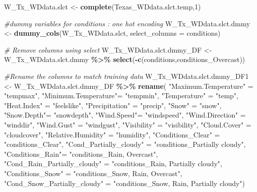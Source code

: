 \documentclass[
]{article}
\newenvironment{Shaded}{\begin{snugshade}}{\end{snugshade}}
\newcommand{\AttributeTok}[1]{\textcolor[rgb]{0.13,0.29,0.53}{#1}}
\newcommand{\CommentTok}[1]{\textcolor[rgb]{0.56,0.35,0.01}{\textit{#1}}}
\newcommand{\DecValTok}[1]{\textcolor[rgb]{0.00,0.00,0.81}{#1}}
\newcommand{\FunctionTok}[1]{\textcolor[rgb]{0.13,0.29,0.53}{\textbf{#1}}}
\newcommand{\NormalTok}[1]{#1}
\newcommand{\OtherTok}[1]{\textcolor[rgb]{0.56,0.35,0.01}{#1}}
\newcommand{\SpecialCharTok}[1]{\textcolor[rgb]{0.81,0.36,0.00}{\textbf{#1}}}
\newcommand{\StringTok}[1]{\textcolor[rgb]{0.31,0.60,0.02}{#1}}
\begin{document}
\begin{Shaded}
\begin{Highlighting}[]
\NormalTok{W\_Tx\_WDdata.slct }\OtherTok{\textless{}{-}} \FunctionTok{complete}\NormalTok{(Texas\_WDdata.slct.temp,}\DecValTok{1}\NormalTok{)}

\CommentTok{\#dummy variables for conditions : one hot encoding}
\NormalTok{W\_Tx\_WDdata.slct.dmmy }\OtherTok{\textless{}{-}} \FunctionTok{dummy\_cols}\NormalTok{(W\_Tx\_WDdata.slct, }
                                         \AttributeTok{select\_columns =} \StringTok{\textquotesingle{}conditions\textquotesingle{}}\NormalTok{)}

\CommentTok{\# Remove columns using select}
\NormalTok{W\_Tx\_WDdata.slct.dmmy\_DF }\OtherTok{\textless{}{-}}\NormalTok{ W\_Tx\_WDdata.slct.dmmy }\SpecialCharTok{\%\textgreater{}\%} 
  \FunctionTok{select}\NormalTok{(}\SpecialCharTok{{-}}\FunctionTok{c}\NormalTok{(conditions,conditions\_Overcast))}

\CommentTok{\#Rename the columns to match training data }
\NormalTok{W\_Tx\_WDdata.slct.dmmy\_DF1 }\OtherTok{\textless{}{-}}\NormalTok{ W\_Tx\_WDdata.slct.dmmy\_DF }\SpecialCharTok{\%\textgreater{}\%} 
        \FunctionTok{rename}\NormalTok{( }
          \StringTok{"Maximum.Temperature"} \OtherTok{=} \StringTok{"tempmax"}\NormalTok{,}
          \StringTok{"Minimum.Temperature"}\OtherTok{=} \StringTok{"tempmin"}\NormalTok{,}
          \StringTok{"Temperature"} \OtherTok{=} \StringTok{"temp"}\NormalTok{,}
          \StringTok{"Heat.Index"} \OtherTok{=} \StringTok{"feelslike"}\NormalTok{,}
          \StringTok{"Precipitation"} \OtherTok{=} \StringTok{"precip"}\NormalTok{,}
          \StringTok{"Snow"} \OtherTok{=} \StringTok{"snow"}\NormalTok{,}
          \StringTok{"Snow.Depth"}\OtherTok{=} \StringTok{"snowdepth"}\NormalTok{,}
          \StringTok{"Wind.Speed"}\OtherTok{=} \StringTok{"windspeed"}\NormalTok{,}
          \StringTok{"Wind.Direction"} \OtherTok{=} \StringTok{"winddir"}\NormalTok{,}
          \StringTok{"Wind.Gust"} \OtherTok{=} \StringTok{"windgust"}\NormalTok{,}
          \StringTok{"Visibility"} \OtherTok{=} \StringTok{"visibility"}\NormalTok{,}
          \StringTok{"Cloud.Cover"} \OtherTok{=} \StringTok{"cloudcover"}\NormalTok{,}
          \StringTok{"Relative.Humidity"} \OtherTok{=} \StringTok{"humidity"}\NormalTok{,}
          \StringTok{"Conditions\_Clear"} \OtherTok{=} \StringTok{"conditions\_Clear"}\NormalTok{,}
          \StringTok{"Cond\_Partially\_cloudy"} \OtherTok{=} \StringTok{"conditions\_Partially cloudy"}\NormalTok{,}
          \StringTok{"Conditions\_Rain"}\OtherTok{=} \StringTok{"conditions\_Rain, Overcast"}\NormalTok{,}
          \StringTok{"Cond\_Rain\_Partially\_cloudy"} \OtherTok{=} \StringTok{"conditions\_Rain, Partially cloudy"}\NormalTok{,}
          \StringTok{"Conditions\_Snow"} \OtherTok{=} \StringTok{"conditions\_Snow, Rain, Overcast"}\NormalTok{,}
          \StringTok{"Cond\_Snow\_Partially\_cloudy"} \OtherTok{=} \StringTok{"conditions\_Snow, Rain, Partially cloudy"}\NormalTok{)}
\end{Highlighting}
\end{Shaded}
\end{document}
